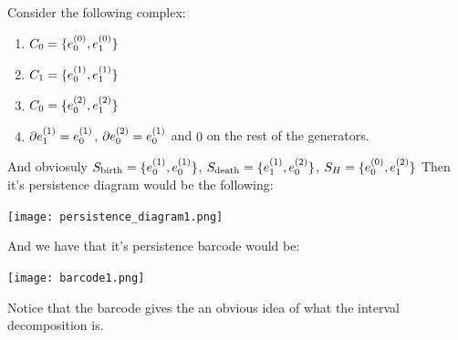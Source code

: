\begin{example}


%
%
%
%
%


Consider the following complex:

\begin{enumerate}

\item $C_0 = \{e_{0}^{(0)},e_{1}^{(0)}\}$

\item $C_1 = \{e_{0}^{(1)},e_{1}^{(1)}\}$

\item $C_0 = \{e_{0}^{(2)},e_{1}^{(2)}\}$

\item $\partial e_{1}^{(1)}=e_{0}^{(1)}$, $\partial e_{0}^{(2)}=e_{0}^{(1)}$ and 
$0$ on the rest of the generators.
\end{enumerate}

And obviosuly $S_{\text{birth}}=\{
e_{0}^{(1)},
e_{0}^{(1)}
\}$,
$S_{\text{death}}=\{
e_{1}^{(1)},
e_{0}^{(2)}
\}$,
$
S_H=\{
e_{0}^{(0)},
e_{1}^{(2)}
\}
$
Then it's persistence diagram would be the following:

\begin{center}
\texttt{[image: persistence\_diagram1.png]}
\end{center}

And we have that it's persistence barcode would be:


\begin{center}
\texttt{[image: barcode1.png]}
\end{center}


\end{example}


Notice that the barcode gives the an obvious idea of
what the interval decomposition is.

